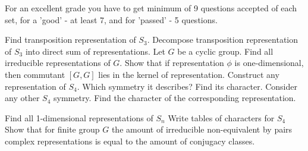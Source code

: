 \documentclass[12pt]{article}
\begin{document}
	
	For an excellent grade you have to get minimum of 9 questions accepted  of each set, for a 'good' - at least 7, and for 'passed' - 5 questions.	
	

	\p
	Find transposition representation of $S_3$.
	\ep
	\p
	Decompose transposition representation of $S_3$ into direct sum of representations.
	\ep
	\p 
	Let $G$ be a cyclic group. Find all irreducible representations of $G$.
	\ep
	\p 
   Show that if  representation $\phi$ is one-dimensional, then commutant $[G,G]$ lies in the kernel of representation.
	\ep
	\p
	Construct any representation of $S_4$. Which symmetry it describes? Find its character.
	\ep
	\p Consider any other $S_4$ symmetry. Find the character of the corresponding representation.
	\ep

	
	\p Find all 1-dimensional representations of $S_n$
	\ep
	\p Write tables of characters for $S_4$
	\ep
	\p Show that for finite group $G$ the amount of irreducible  non-equivalent by pairs complex representations is equal to the amount of conjugacy classes.	
	\ep


	
\end{document}
